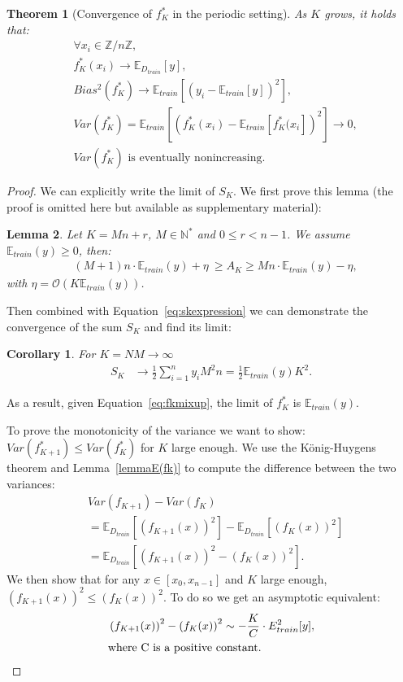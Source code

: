 \documentclass[twoside]{article}
\newtheorem{theorem}{Theorem}[section]
\newtheorem{corollary}{Corollary}[theorem]
\newtheorem{lemma}[theorem]{Lemma}
\numberwithin{intassumption}{assumption}
\begin{document}
\begin{theorem}[Convergence of $f^*_K$ in the periodic setting]
As $K$ grows, it holds that:
    \begin{align}
     &\forall x_i \in \mathbb{Z}/n\mathbb{Z}, \nonumber\\
     &f_K^*(x_i) \to \mathbb{E}_{D_{train}}[y],\\
     &Bias^2(f^*_K) \to \mathbb{E}_{train}[(y_i-\mathbb{E}_{train}[y])^2],\\
     &Var(f^*_K) =  \mathbb{E}_{train}[\left(f^*_K(x_i)-\mathbb{E}_{train}[f^*_K(x_i]\right)^2] \to 0, \\
     &Var(f^*_K) \text{ is eventually nonincreasing}. \nonumber
    \end{align}
\end{theorem}
\begin{proof}
We can explicitly write the limit of $S_K$. We first prove this lemma (the proof is omitted here but available as supplementary material):
\begin{lemma}
Let $K = Mn + r$, $M \in \mathbb{N}^*$ and $0\leq r<n-1$. We assume $\mathbb{E}_{train}(y) \geq 0$, then:
    \begin{align}
         &(M+1)n \cdot \mathbb{E}_{train}(y) + \eta \  \geq A_K \geq Mn \cdot\mathbb{E}_{train}(y) -\eta,
    \end{align}
with $\eta=\mathcal{O}(K\mathbb{E}_{train}(y))$.
\end{lemma} 

Then combined with Equation~\eqref{eq:skexpression} we can demonstrate the convergence of the sum $S_K$ and find its limit:
\begin{corollary}
    For $K = NM \to \infty$
    \begin{align}
        S_K &\to \frac{1}{2}\sum_{i=1}^n y_iM^2n  =\frac{1}{2} \mathbb{E}_{train}(y)K^2.
    \end{align}
\end{corollary}

As a result, given Equation~\eqref{eq:fkmixup}, the limit of $f^*_K$ is $\mathbb{E}_{train}(y)$.

To prove the monotonicity of the variance we want to show: $Var(f^*_{K+1}) \leq Var(f^*_K)$ for $K$ large enough. We use the König-Huygens theorem and Lemma~\ref{lemmaE(fk)} to compute the difference between the two variances:
\begin{align*}
    & Var(f_{K+1}) - Var(f_K) \\
    &=\mathbb{E}_{D_{train}}[\left(f_{K+1}(x)\right)^2] -  \mathbb{E}_{D_{train}}[\left(f_K(x)\right)^2] \\
    &= \mathbb{E}_{D_{train}}[\left(f_{K+1}(x)\right)^2 -  \left(f_K(x)\right)^2].
\end{align*}
We then show that for any $x\in [x_0,x_{n-1}]$ and $K$ large enough, $\left(f_{K+1}(x)\right)^2 \leq \left(f_{K}(x)\right)^2$. To do so we get an asymptotic equivalent: 
\begin{align*}
&\left(f_{K+1}(x)\right)^2 - \left(f_{K}(x)\right)^2 \sim  -\frac{ K }{C} \cdot E_{train}^2[y],\\
& \text{where C is a positive constant}.\qedhere
\end{align*}\end{proof}
\end{document}
